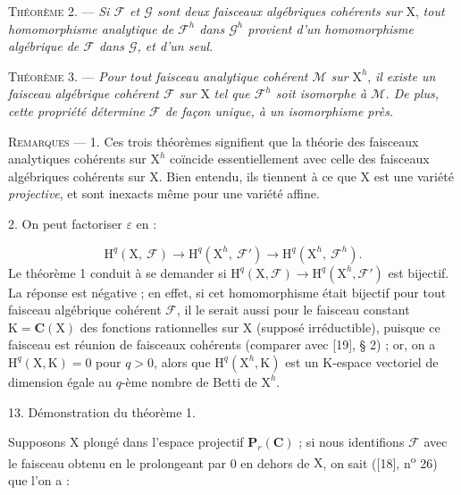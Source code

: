 \textsc{Théorème} 2. --- \textit{Si $\mathcal{F}$ et $\mathcal{G}$ sont deux faisceaux algébriques cohérents sur} $\mathrm{X}$, \textit{tout homomorphisme analytique de $\mathcal{F}^h$ dans $\mathcal{G}^h$ provient d'un homomorphisme algébrique de $\mathcal{F}$ dans $\mathcal{G}$, et d'un seul.}



\textsc{Théorème} 3. --- \textit{Pour tout faisceau analytique cohérent $\mathcal{M}$ sur} $\mathrm{X}^h$, \textit{il existe un faisceau algébrique cohérent $\mathcal{F}$ sur} $\mathrm{X}$ \textit{tel que $\mathcal{F}^h$ soit isomorphe à $\mathcal{M}$. De plus, cette propriété détermine $\mathcal{F}$ de façon unique, à un isomorphisme près.}

\textsc{Remarques} --- 1. Ces trois théorèmes signifient que la théorie des faisceaux analytiques cohérents sur $\mathrm{X}^h$ coïncide essentiellement avec celle des faisceaux algébriques cohérents sur $\mathrm{X}$. Bien entendu, ils tiennent à ce que $\mathrm{X}$ est une variété \textit{projective}, et sont inexacts même pour une variété affine.

2. On peut factoriser $\varepsilon$ en :

\begin{equation*}
\mathrm{H}^q(\mathrm{X},\ \mathcal{F}) \longrightarrow \mathrm{H}^q(\mathrm{X}^h,\ \mathcal{F}') \longrightarrow \mathrm{H}^q(\mathrm{X}^h,\ \mathcal{F}^h).
\end{equation*}
Le théorème 1 conduit à se demander si $\mathrm{H}^q(\mathrm{X}, \mathcal{F}) \longrightarrow \mathrm{H}^q(\mathrm{X}^h, \mathcal{F}')$ est bijectif. La réponse est négative ; en effet, si cet homomorphisme était bijectif pour tout faisceau algébrique cohérent $\mathcal{F}$, il le serait aussi pour le faisceau constant $\mathrm{K} = \mathbf{C}(\mathrm{X})$ des fonctions rationnelles sur $\mathrm{X}$ (supposé irréductible), puisque ce faisceau est réunion de faisceaux cohérents (comparer avec [19], § 2) ; or, on a $\mathrm{H}^q(\mathrm{X}, \mathrm{K}) = 0$ pour $q > 0$, alors que $\mathrm{H}^q(\mathrm{X}^h, \mathrm{K})$ est un $\mathrm{K}$-espace vectoriel de dimension égale au $q$-ème nombre de Betti de $\mathrm{X}^h$.


13. Démonstration du théorème 1.

Supposons $\mathrm{X}$ plongé dans l'espace projectif $\mathbf{P}_r(\mathbf{C})$ ; si nous identifions $\mathcal{F}$ avec le faisceau obtenu en le prolongeant par 0 en dehors de $\mathrm{X}$, on sait ([18], n\textsuperscript{o} 26) que l'on a :

